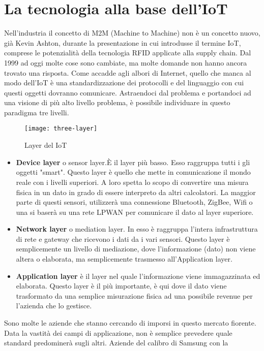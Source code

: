 \section{La tecnologia alla base dell'IoT} 
Nell'industria il concetto di M2M (Machine to Machine) non è un concetto
nuovo,
già Kevin Ashton, durante la presentazione in cui introdusse il termine IoT,
comprese le potenzialità della tecnologia RFID applicate alla supply chain. Dal
1999 ad oggi molte cose sono cambiate, ma molte domande non hanno ancora trovato
una risposta. Come accadde agli albori di Internet, quello che manca al modo
dell'IoT è una standardizzazione dei protocolli e del linguaggio con cui questi
oggetti dovranno comunicare. Astraendoci dal problema e portandoci ad una visione
di più alto livello problema, è possibile individuare in questo paradigma
tre livelli.
\begin{figure}[ht]
        \centering 
                \texttt{[image: three-layer]}
        \caption{Layer del IoT}
\end{figure}
\begin{itemize}
\item \textbf{Device layer} o sensor layer.È il layer più basso. Esso raggruppa
tutti i gli oggetti "smart". Questo layer è quello che mette in comunicazione il
mondo reale con i livelli superiori. A loro spetta lo scopo di convertire
una misura fisica in un dato in grado di essere  interpreto da altri calcolatori.
La maggior parte di questi sensori, utilizzerà una connessione Bluetooth,
ZigBee, Wifi o una si baserà su una rete LPWAN per comunicare il dato al layer
superiore.
\item \textbf{Network layer} o mediation layer. In esso è raggruppa l'intera infrastruttura
di rete e gateway che ricevono i dati da i vari sensori. Questo layer è
semplicemente un livello di mediazione, dove l'informazione (dato) non viene
altera o elaborata, ma semplicemente trasmesso all'Application layer.
\item \textbf{Application layer} è il layer nel quale l'informazione viene
immagazzinata ed elaborata. Questo layer è il più importante, è qui dove il dato
viene trasformato da una semplice misurazione fisica ad una possibile revenue
per l'azienda che lo gestisce.%
\end{itemize}
Sono molte le aziende che stanno cercando di imporsi in questo
mercato fiorente. Data la vastità dei campi di applicazione, non è semplice
prevedere quale standard predominerà sugli altri.
Aziende del calibro di Samsung con la
